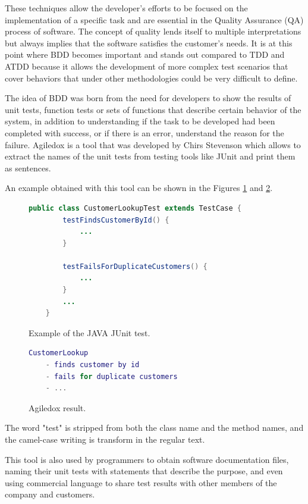 \documentclass[journal]{IEEEtran}	%
\begin{document}
These techniques allow the developer's efforts to be focused on the implementation of a specific task and are essential in the Quality Assurance (QA) process of software. The concept of quality lends itself to multiple interpretations but always implies that the software satisfies the customer's needs. It is at this point where BDD becomes important and stands out compared to TDD and ATDD because it allows the development of more complex test scenarios that cover behaviors that under other methodologies could be very difficult to define.

The idea of BDD was born from the need for developers to show the results of unit tests, function tests or sets of functions that describe certain behavior of the system, in addition to understanding if the task to be developed had been completed with success, or if there is an error, understand the reason for the failure. Agiledox is a tool that was developed by Chirs Stevenson which allows to extract the names of the unit tests from testing tools like JUnit and print them as sentences. 

An example obtained with this tool can be shown in the Figures \ref*{fig:JUnitTest} and \ref*{fig:agiledox}.

\begin{figure}[H]
\centering
\begin{lstlisting}[language=java]
    public class CustomerLookupTest extends TestCase {
        testFindsCustomerById() {
            ...
        }
        
        testFailsForDuplicateCustomers() {
            ...
        }
        ...
    }
\end{lstlisting}
\caption{Example of the JAVA JUnit test.}
\label{fig:JUnitTest}
\end{figure}

\begin{figure}[H]
\centering
\begin{lstlisting}[language=Matlab]
    CustomerLookup
    - finds customer by id
    - fails for duplicate customers
    - ...
\end{lstlisting}
\caption{Agiledox result.}
\label{fig:agiledox}
\end{figure}

The word "test" is stripped from both the class name and the method names, and the camel-case writing is transform in the regular text. 

This tool is also used by programmers to obtain software documentation files, naming their unit tests with statements that describe the purpose, and even using commercial language to share test results with other members of the company and customers.
\end{document}

